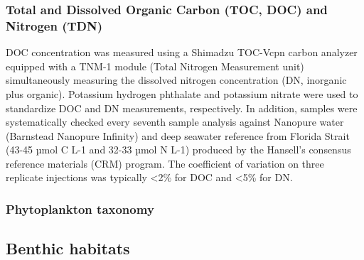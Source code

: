 \documentclass[essd, manuscript]{copernicus}
\begin{document}
\subsubsection{Total and Dissolved Organic Carbon (TOC, DOC) and Nitrogen (TDN)}
DOC concentration was measured using a Shimadzu TOC-Vcpn carbon analyzer equipped with a TNM-1 module (Total Nitrogen Measurement unit) simultaneously measuring the dissolved nitrogen concentration (DN, inorganic plus organic). Potassium hydrogen phthalate and potassium nitrate were used to standardize DOC and DN measurements, respectively. In addition, samples were systematically checked every seventh sample analysis against Nanopure water (Barnstead Nanopure Infinity) and deep seawater reference from Florida Strait (43-45 µmol C L-1 and 32-33 µmol N L-1) produced by the Hansell’s consensus reference materials (CRM) program. The coefficient of variation on three replicate injections was typically <2\% for DOC and <5\% for DN.

\subsubsection{Phytoplankton taxonomy}

\subsection{Benthic habitats} \label{benthos}
\end{document}
